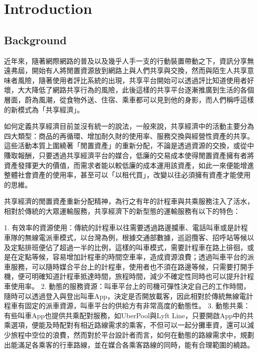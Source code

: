 
\chapter{Introduction}

\section{Background}

近年來，隨著網際網路的普及以及幾乎人手一支的行動裝置帶動之下，資訊分享無遠弗屆，開始有人將閒置資源放到網路上與人們共享與交換，然而與陌生人共享意味者風險，隨著使用者評比系統的出現，共享平台開始可以透過評比知道使用者好壞，大大降低了網路共享行為的風險\cite{schor_debating_2014}，此後這樣的共享平台逐漸推廣到生活的各個層面，蔚為風潮，從食物外送、住宿、乘車都可以見到他的身影，而人們稱呼這樣的新模式為「共享經濟」。

如何定義共享經濟目前並沒有統一的說法，一般來說，共享經濟中的活動主要分為四大類型：商品的再循環、增加耐久財的使用率、服務交換與經營性資產的共享\cite{schor_debating_2014}。這些活動本質上圍繞著「閒置資產」的重新分配\cite{frenken_smarter_2015}，不論是透過資源的交換，或從中賺取報酬，只要透過共享經濟平台的媒合，低廉的交易成本使得閒置資產擁有者將資產發揮更大的價值，而需求者能以較低廉的成本運用該資產，如此一來便能增進整體社會資產的使用率，甚至可以「以租代買」，改變以往必須擁有資產才能使用的思維。

共享經濟的閒置資產重新分配精神，為行之有年的計程車與共乘服務注入了活水，相對於傳統的大眾運輸服務，共享經濟下的新型態的運輸服務有以下的特色：
  
1. 有效率的資源使用：傳統的計程車以往需要透過路邊攔車、電話叫車或是計程車隊的無線電派車模式，以台灣為例，根據交通部數據，巡迴攬客、招呼站等候以及定點排班\cite{noauthor_100nianjichengcheyingyunzhuangkuangdiaochabaogao_2012}便佔了超過一半的比例，這樣的叫車模式，需要計程車在路上徘徊，或是在定點等候，容易增加計程車的時間空車率，造成資源浪費；透過叫車平台的派車服務，可以隨時媒合平台上的計程車，使用者也不須在路邊等候，只需要打開手機，便可明確知道計程車抵達時間，旅程時間，減少不確定性同時也可以提升計程車使用率。
2. 動態的服務資源：叫車平台上的司機可彈性決定自己的工作時間，隨時可以透過登入與登出叫車App，決定是否開放載客，因此相對於傳統無線電計程車有固定的派車資源，叫車平台的供給方有非常高度的動態性。
3. 動態共乘：有些叫車App也提供共乘配對服務，如UberPool與Lyft Line，只要開啟App中的共乘選項，便能及時配對有相近路線需求的乘客，不但可以一起分攤車資，還可以減少旅程中空位的浪費，然而對於平台設計者而言，如何在動態的路線需求中，規劃出能滿足各乘客的行車路線，並在媒合各乘客路線的同時，能有合理範圍的繞路。

